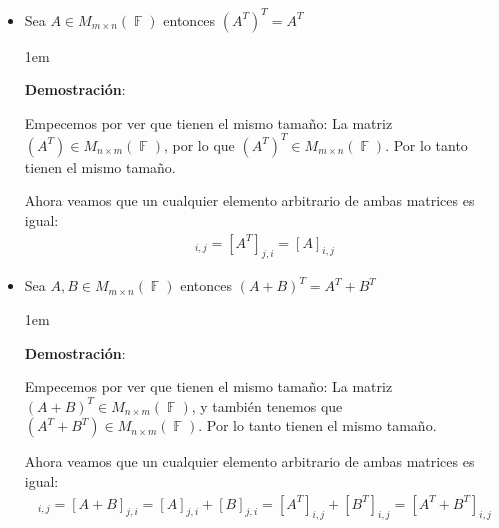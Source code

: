 \documentclass[12pt, fleqn]{report}                             %
\newenvironment{SmallIndentation}[1][0.75em]                    %
        {\begin{adjustwidth}{#1}{}\begin{footnotesize}}             %
        {\end{footnotesize}\end{adjustwidth}}                       %
\theoremstyle{break}                                            %
\DeclareMathOperator \GenericField {\mathbb{F}}                 %
\newcommand{\Brackets}[1]{\left[ #1 \right]}                    %
\begin{document}
                \begin{itemize}

                    \item Sea $A\in M_{m \times n}(\GenericField)$ entonces $(A^T)^T = A^T$
                        \begin{SmallIndentation}[1em]
                            \textbf{Demostración}:

                            Empecemos por ver que tienen el mismo tamaño:
                            La matriz $(A^T) \in M_{n \times m}(\GenericField)$, por lo que 
                            $(A^T)^T \in M_{m \times n}(\GenericField)$.
                            Por lo tanto tienen el mismo tamaño.

                            Ahora veamos que un cualquier elemento arbitrario de ambas matrices es igual:
                            \begin{align*}
                                [(A^T)^T]_{i, j}    
                                    = [A^T]_{j, i}               
                                    = [A]_{i, j}
                            \end{align*}

                        \end{SmallIndentation}

                    \item Sea $A,B \in M_{m \times n}(\GenericField)$ entonces 
                        $(A+B)^T = A^T + B^T$

                        \begin{SmallIndentation}[1em]
                            \textbf{Demostración}:

                            Empecemos por ver que tienen el mismo tamaño:
                            La matriz $(A+B)^T \in M_{n \times m}(\GenericField)$, y también tenemos que
                            $(A^T+B^T) \in M_{n \times m}(\GenericField)$. Por lo tanto tienen el mismo
                            tamaño.

                            Ahora veamos que un cualquier elemento arbitrario de ambas matrices es igual:
                            \begin{align*}
                                [(A+B)^T]_{i, j}    
                                    = [A + B]_{j, i}               
                                    = [A]_{j, i} + [B]_{j, i}      
                                    = [A^T]_{i, j} + [B^T]_{i, j}
                                    = \Brackets{A^T + B^T}_{i, j}
                            \end{align*}


\end{SmallIndentation}
\end{itemize}
\end{document}
